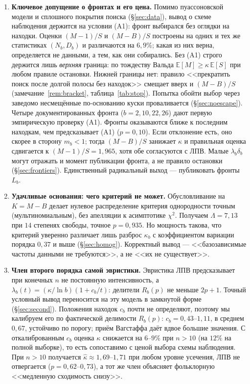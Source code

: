 \documentclass[11pt,a4paper]{article}
\theoremstyle{plain}
\theoremstyle{remark}
\newcommand{\Rb}{R_b}
\begin{document}
\begin{enumerate}
\item\textbf{Ключевое допущение о фронтах и его цена.} Помимо пуассоновской
модели и сплошного покрытия поиска (\S\ref{sec:data}), вывод о схеме наблюдения
держится на условии (A1): фронт выбирался без оглядки на находки. Оценки $(M-1)/S$ и
$(M-B)/S$ построены на одних и тех же статистиках $(N_b,D_b)$ и различаются на
$6{,}9\%$; какая из них верна, определяется не данными, а тем, как они
собирались. Без (A1) строго держится лишь \emph{верхняя} граница: по тождеству
Вальда $\mathbb E[M]\ge\kappa\,\mathbb E[S]$ при любом правиле остановки.
Нижней границы нет: правило <<прекратить поиск после долгой полосы без находок>>
смещает вверх и $(M-B)/S$ (замечание~\ref{rem:bracket}, таблица~\ref{tab:stop}).
Попытка обойти выбор через заведомо несмещённые по-основанию куски проваливается
(\S\ref{sec:noescape}). Четыре документированных фронта ($b=2,10,22,26$) дают
первую эмпирическую проверку (A1). Фронты оказываются ближе к последним находкам,
чем предсказывает (A1) ($p=0{,}10$). Если отклонение есть, оно скорее в сторону
$m_b<1$; тогда $(M-B)/S$ занижает $\kappa$ и правильная оценка сдвигается к
$(M-1)/S=1{,}965$, хотя обе согласуются с ЛПВ. Малые $\lambda_b\delta_b$ могут
отражать и момент публикации фронта, а не правило остановки
(\S\ref{sec:frontiers}). Единственный радикальный выход --- публиковать фронты
$L_b$.

\item\textbf{Удачливые основания: чего критерий не может.} Обусловливание на
$K=M-B$ делает нулевое распределение критерия однородности точным
(мультиномиальным), без апелляции к асимптотике $\chi^2$. Получаем
$\Lambda=7{,}13$ при $14$ степенях свободы, точное $p=0{,}935$. Но мощность
такова, что критерий уверенно различает лишь разброс $\kappa_b$ с коэффициентом
вариации порядка $0{,}37$ и выше
(\S\ref{sec:homog}). Корректный вывод --- <<базозависимые частоты данными не
требуются>>, а не <<их не существует>>.

\item\textbf{Член второго порядка самой эвристики.} Эвристика ЛПВ предсказывает
при конечных $n$ не постоянную интенсивность, а
$\lambda_b(t)=(\kappa/\ln b)(1+c_b/t)$: делители $\Rb(p)$ не меньше $2p+1$.
Точный условный вывод переносится на эту модель в замкнутой форме
(\S\ref{sec:second}). Положения находок $c_b$ почти не определяют, поэтому мы
калибруем его по фактической делимости $\Rb(p)$: $c_b=0{,}43$--$1{,}11$, в
среднем $0{,}67$, устойчиво по порогу; приём Вагстаффа даёт вдвое большие
значения. С откалиброванным $c_b$ оценка $\kappa$ снижается на $6$--$9\%$ при $n>10$
(на $12\%$ на полной выборке), то есть сопоставимо с ценой выбора схемы
наблюдения. При $n>10$ получается $\hat\kappa\approx1{,}69$--$1{,}71$ при любом
уровне усечения, ЛПВ не отвергается ($p=0{,}62$--$0{,}73$), а тот же член объясняет
фольклорную <<медленную сходимость снизу>>.


\end{enumerate}
\end{document}

